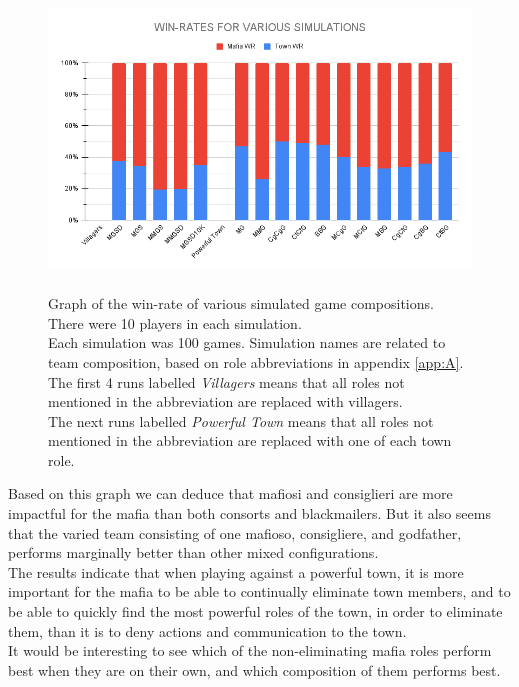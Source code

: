\begin{figure}[H]
    \includegraphics[width=1\linewidth]{figures/Winrates}
    \caption{\\Graph of the win-rate of various simulated game compositions.\\
        There were 10 players in each simulation.\\
        Each simulation was 100 games.
        Simulation names are related to team composition, based on role
        abbreviations in appendix \ref{app:A}.\\
        The first 4 runs labelled \textit{Villagers} means that all roles not
        mentioned in the abbreviation are replaced with villagers.\\
        The next runs labelled \textit{Powerful Town} means that all roles not
        mentioned in the abbreviation are replaced with	one of each town role.}
    \label{fig:VariousSimulations}
\end{figure}
\vspace{-5px}Based on this graph we can deduce that mafiosi and
consiglieri are more
impactful for the mafia than both consorts and blackmailers. But it also seems
that the varied team consisting of one mafioso, consigliere, and godfather,
performs marginally better than other mixed configurations. \\
The results indicate that when playing against a powerful town, it is more
important for the mafia to be able to continually eliminate town members, and to be
able to quickly find the most powerful roles of the town, in order to eliminate
them, than it is to deny actions and communication to the town. \\
It would be interesting to see which of the non-eliminating mafia roles perform
best when they are on their own, and which composition of them performs best.
